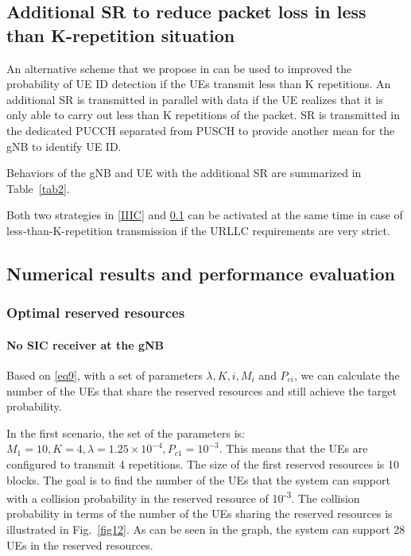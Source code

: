 \documentclass{ieeeaccess}
\begin{document}
\subsection{Additional SR to reduce packet loss in less than K-repetition situation}\label{IIID}

An alternative scheme that we propose in \cite{ad100} can be used to improved the probability of UE ID detection if the UEs transmit less than K repetitions. An additional SR is transmitted in parallel with data if the UE realizes that it is only able to carry out less than K repetitions of the packet. SR is transmitted in the dedicated PUCCH separated from PUSCH to provide another mean for the gNB to identify UE ID.

Behaviors of the gNB and UE with the additional SR are summarized in Table~\ref{tab2}. 

Both two strategies in \ref{IIIC} and \ref{IIID} can be activated at the same time in case of less-than-K-repetition transmission if the URLLC requirements are very strict.

\subsection{Numerical results and performance evaluation}\label{IV}

\subsubsection{Optimal reserved resources}
\paragraph{No SIC receiver at the gNB}\label{IVB1}
Based on \eqref{eq9}, with a set of parameters  $\lambda, K, i, M_{i}$ and $P_{ci}$, we can calculate the number of the UEs that share the reserved resources and still achieve the target probability.

In the first scenario, the set of the parameters is: $M_1=10, K=4, \lambda=1.25\times10^{-4}, P_{c1}=10^{-3}$. This means that the UEs are configured to transmit 4 repetitions. The size of the first reserved resources is 10 blocks. The goal is to find the number of the UEs that the system can support with a collision probability in the reserved resource of 10\textsuperscript{-3}. The collision probability in terms of the number of the UEs sharing the reserved resources is illustrated in Fig.~\ref{fig12}. As can be seen in the graph, the system can support 28 UEs in the reserved resources.
\end{document}
